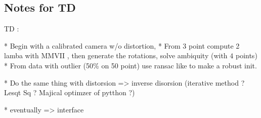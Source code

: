 \subsection{Notes for TD}


TD :

*  Begin with a calibrated camera w/o distortion,
*  From $3$ point compute 2 lamba with MMVII , then generate the rotations, solve ambiquity (with $4$ points)
*  From data with outlier (50\% on 50 point) use ransac like to make a robust init.

*  Do the same thing with distorsion => inverse disorsion (iterative method ? Lesqt Sq ? Majical optimzer of pytthon ?)

*  eventually => interface




